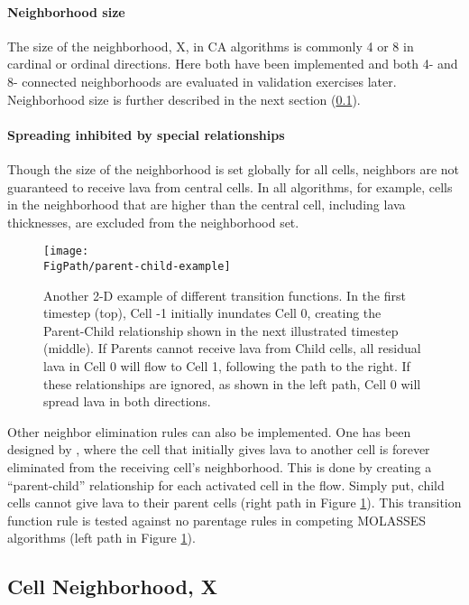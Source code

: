 		\paragraph{Neighborhood size} The size of the neighborhood, X, in CA algorithms is commonly 4 or 8 in cardinal or ordinal directions. Here both have been implemented and both 4- and 8- connected neighborhoods are evaluated in validation exercises later. Neighborhood size is further described in the next section (\ref{sec_X}).

		\paragraph{Spreading inhibited by special relationships} Though the size of the neighborhood is set globally for all cells, neighbors are not guaranteed to receive lava from central cells. In all algorithms, for example, cells in the neighborhood that are higher than the central cell, including lava thicknesses, are excluded from the neighborhood set.
		
		\begin{figure}[!h]
			\centering
			\texttt{[image: \\FigPath/parent-child-example]}
			\caption[A 2-D example of different transition functions with different ``parentage'' rules]{Another 2-D example of different transition functions. In the first timestep (top), Cell -1 initially inundates Cell 0, creating the Parent-Child relationship shown in the next illustrated timestep (middle). If Parents cannot receive lava from Child cells, all residual lava in Cell 0 will flow to Cell 1, following the path to the right. If these relationships are ignored, as shown in the left path, Cell 0 will spread lava in both directions.}
			\label{fig_ParentTrap}
		\end{figure}
		
		Other neighbor elimination rules can also be implemented. One has been designed by \citet{connor2012probabilistic}, where the cell that initially gives lava to another cell is forever eliminated from the receiving cell's neighborhood. This is done by creating a ``parent-child'' relationship for each activated cell in the flow. Simply put, child cells cannot give lava to their parent cells (right path in Figure \ref{fig_ParentTrap}). This transition function rule is tested against no parentage rules in competing MOLASSES algorithms (left path in Figure \ref{fig_ParentTrap}).
		
	\subsection{Cell Neighborhood, X}\label{sec_X}
	
